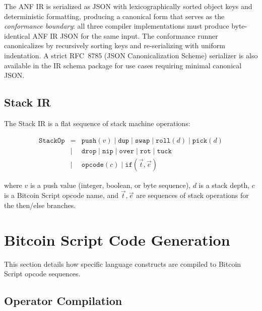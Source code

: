 \documentclass[11pt,a4paper]{article}
\begin{document}
The ANF IR is serialized as JSON with lexicographically sorted object keys
and deterministic formatting, producing a canonical form that serves as the
\emph{conformance boundary}: all three compiler implementations must produce
byte-identical ANF IR JSON for the same input. The conformance runner
canonicalizes by recursively sorting keys and re-serializing with uniform
indentation. A strict RFC~8785 (JSON Canonicalization Scheme) serializer
is also available in the IR schema package for use cases requiring minimal
canonical JSON.

\subsection{Stack IR}
\label{sec:ir-stack}

The Stack IR is a flat sequence of stack machine operations:

\[
\begin{array}{rcl}
\texttt{StackOp} &=& \texttt{push}(v) \mid \texttt{dup} \mid \texttt{swap} \mid \texttt{roll}(d) \mid \texttt{pick}(d) \\
  &\mid& \texttt{drop} \mid \texttt{nip} \mid \texttt{over} \mid \texttt{rot} \mid \texttt{tuck} \\
  &\mid& \texttt{opcode}(c) \mid \texttt{if}(\vec{t}, \vec{e})
\end{array}
\]

where $v$ is a push value (integer, boolean, or byte sequence), $d$ is a
stack depth, $c$ is a Bitcoin Script opcode name, and $\vec{t}, \vec{e}$
are sequences of stack operations for the then/else branches.

\section{Bitcoin Script Code Generation}
\label{sec:codegen}

This section details how specific language constructs are compiled to
Bitcoin Script opcode sequences.

\subsection{Operator Compilation}
\label{sec:codegen-ops}
\end{document}
